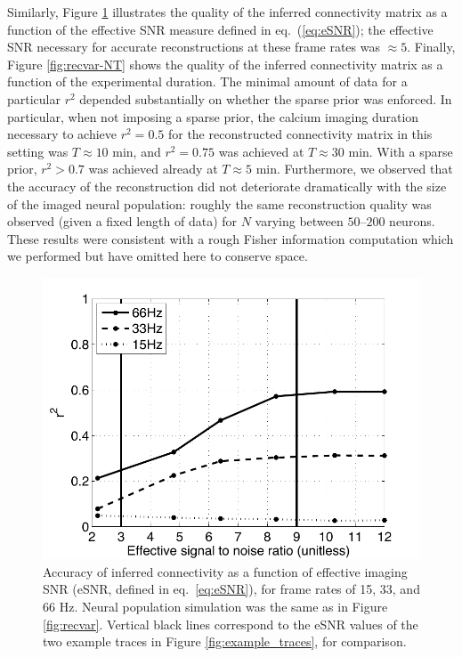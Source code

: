 \documentclass[aoas,preprint]{imsart}
\begin{document}
Similarly, Figure \ref{fig:recvar-SNR} illustrates the quality of the
inferred connectivity matrix as a function of the effective SNR
measure defined in eq.~(\ref{eq:eSNR}); the effective SNR necessary
for accurate reconstructions at these frame rates was $\approx 5$.
Finally, Figure \ref{fig:recvar-NT} shows the quality of the inferred
connectivity matrix as a function of the experimental duration. The
minimal amount of data for a particular $r^2$ depended substantially
on whether the sparse prior was enforced.  In particular, when not
imposing a sparse prior, the calcium imaging duration necessary to
achieve $r^2=0.5$ for the reconstructed connectivity matrix in this
setting was $T\approx 10$ min, and $r^2=0.75$ was achieved at
$T\approx 30$ min.  With a sparse prior, $r^2>0.7$ was achieved
already at $T\approx 5$ min. Furthermore, we observed that the
accuracy of the reconstruction did not deteriorate dramatically with
the size of the imaged neural population: roughly the same
reconstruction quality was observed (given a fixed length of data) for
$N$ varying between $50$--$200$ neurons.  These results were
consistent with a rough Fisher information computation which we
performed but have omitted here to conserve space.


\begin{figure}[t!]
\centering
\begin{minipage}[c]{0.6\hsize}
\includegraphics[width=\hsize]{../figs/FigureA6_recvar_SNRc}
\end{minipage}
\caption{Accuracy of inferred connectivity as a function of effective
imaging SNR (eSNR, defined in eq.~\ref{eq:eSNR}), for frame rates of
15, 33, and 66 Hz.  Neural population simulation was the same as in
Figure \ref{fig:recvar}.  Vertical black lines correspond to the eSNR
values of the two example traces in Figure \ref{fig:example_traces},
for comparison.}
\label{fig:recvar-SNR}
\end{figure}
\end{document}
